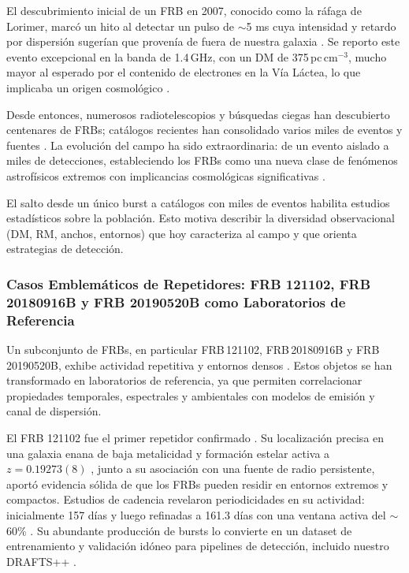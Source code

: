 El descubrimiento inicial de un FRB en 2007, conocido como la ráfaga de Lorimer, marcó un hito al detectar un pulso de $\sim$5 ms cuya intensidad y retardo por dispersión sugerían que provenía de fuera de nuestra galaxia \citep{Lorimer2007}. Se reporto este evento excepcional en la banda de 1.4\,GHz, con un DM de 375\,pc\,cm$^{-3}$, mucho mayor al esperado por el contenido de electrones en la Vía Láctea, lo que implicaba un origen cosmológico \citep{Lorimer2007,CordesMcLaughlin2003}.

Desde entonces, numerosos radiotelescopios y búsquedas ciegas han descubierto centenares de FRBs; catálogos recientes han consolidado varios miles de eventos y fuentes \citep{CHIME2021,CHIMEFRB_2021_Catalog1}. La evolución del campo ha sido extraordinaria: de un evento aislado a miles de detecciones, estableciendo los FRBs como una nueva clase de fenómenos astrofísicos extremos con implicancias cosmológicas significativas \citep{Petroff_2022}.

 El salto desde un único burst a catálogos con miles de eventos habilita estudios estadísticos sobre la población. Esto motiva describir la diversidad observacional (DM, RM, anchos, entornos) que hoy caracteriza al campo y que orienta estrategias de detección.

\subsubsection{Casos Emblemáticos de Repetidores: FRB 121102, FRB 20180916B y FRB 20190520B como Laboratorios de Referencia}

Un subconjunto de FRBs, en particular FRB\,121102, FRB\,20180916B y FRB\,20190520B, exhibe actividad repetitiva y entornos densos \citep{CHIME2021,Niu2022_FRB20190520B}. Estos objetos se han transformado en laboratorios de referencia, ya que permiten correlacionar propiedades temporales, espectrales y ambientales con modelos de emisión y canal de dispersión.

El FRB 121102 fue el primer repetidor confirmado \citep{Spitler2016}. Su localización precisa en una galaxia enana de baja metalicidad y formación estelar activa a $z = 0.19273(8)$ \citep{2017Natur.541...58C,Tendulkar2017}, junto a su asociación con una fuente de radio persistente, aportó evidencia sólida de que los FRBs pueden residir en entornos extremos y compactos. Estudios de cadencia revelaron periodicidades en su actividad: inicialmente 157 días \citep{2020MNRAS.495.3551R} y luego refinadas a 161.3 días con una ventana activa del $\sim$60\% \citep{cruces2020frb121102}. Su abundante producción de bursts lo convierte en un dataset de entrenamiento y validación idóneo para pipelines de detección, incluido nuestro DRAFTS++ \citep{zhang2024drafts}.

